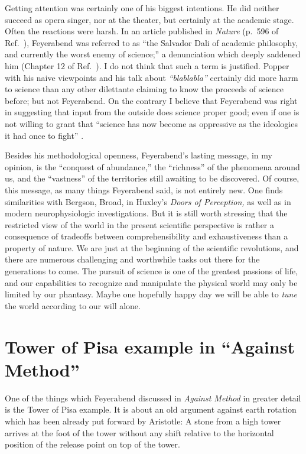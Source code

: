 \documentclass{article}
\begin{document}
Getting attention was certainly one of his biggest intentions.
He did neither succeed as opera singer, nor at the theater, but certainly at the academic stage.
Often the reactions were harsh.
In an article published in {\em Nature}
(p.~596 of Ref.~\cite{theo-psi-1987}), Feyerabend was referred to as
{ ``the Salvador Dali of academic philosophy, and currently the worst enemy of science;''}
a denunciation which deeply saddened him (Chapter 12 of Ref.~\cite{feyerabend-auto}).
I do not think that such a term is justified.
Popper with his naive viewpoints and his talk about {\em ``blablabla''}
certainly did more harm to science \cite{svozil-2002-popper}
than any other dilettante claiming to know the proceeds of science before;
but not Feyerabend.
 On the contrary I believe that Feyerabend was right in suggesting
that input from the outside does science proper good;
even if one is not willing to grant that
{ ``science has now become as oppressive as the ideologies it had once to fight''}
\cite{feyerabend-defense,feyer-81}.


Besides his methodological openness,
Feyerabend's lasting message, in my opinion, is the ``conquest of abundance,''
the ``richness'' of the phenomena around us, and
the ``vastness'' of the territories still awaiting to be discovered.
Of course, this message, as many things Feyerabend said, is not entirely new.
One finds similarities with Bergson, Broad, in Huxley's {\em Doors of Perception,}
as well as in modern neurophysiologic investigations.
But it is still worth stressing that
the restricted view of the world in the present scientific perspective
is rather a consequence of  tradeoffs between comprehensibility and exhaustiveness
than a property of nature.
We are just at the beginning
of the scientific revolutions, and there are numerous challenging
and worthwhile tasks out there for the generations to come.
The pursuit of science is one of the greatest passions of life,
and our capabilities to recognize and manipulate the physical world
may only be limited by our phantasy.
Maybe one hopefully happy day we will be able to {\em tune} the world according to our will alone.


\section{Tower of Pisa example in ``Against Method''}

One of the things which Feyerabend discussed in {\em Against Method} \cite{feyerabend} in greater detail
is the Tower of Pisa example.
It is about an old argument against earth rotation which has been already put forward by Aristotle:
A stone from a high tower arrives at the foot of the tower without
any shift relative to the horizontal position of the release point on top of the tower.
\end{document}
